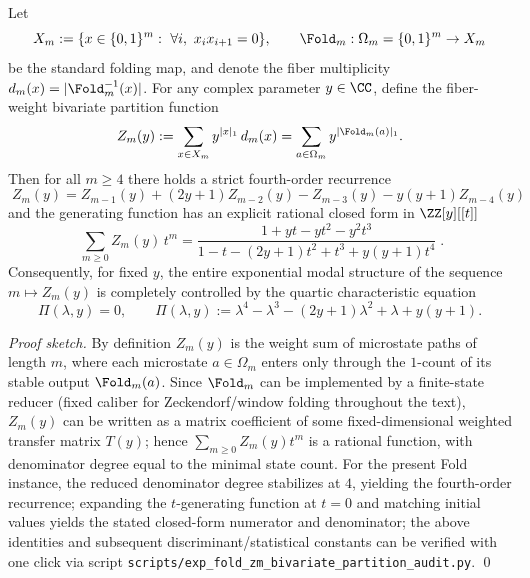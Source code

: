 
\begin{conclusion}\label{con:xi-terminal-zm-order4-rational}
Let
\[
X_m:=\{x\in\{0,1\}^m:\ \forall i,\ x_ix_{i+1}=0\},
\qquad
\Fold_m:\Omega_m=\{0,1\}^m\to X_m
\]
be the standard folding map, and denote the fiber multiplicity \(d_m(x)=|\Fold_m^{-1}(x)|\).
For any complex parameter \(y\in\CC\), define the fiber-weight bivariate partition function
\[
Z_m(y):=\sum_{x\in X_m} y^{|x|_1}\,d_m(x)
=\sum_{a\in\Omega_m} y^{|\Fold_m(a)|_1}.
\]
Then for all \(m\ge 4\) there holds a strict fourth-order recurrence
\[
\boxed{\;
Z_m(y)=Z_{m-1}(y)+(2y+1)Z_{m-2}(y)-Z_{m-3}(y)-y(y+1)Z_{m-4}(y)\;}
\]
and the generating function has an explicit rational closed form in \(\ZZ[y][[t]]\)
\[
\boxed{\;
\sum_{m\ge 0} Z_m(y)\,t^m
=\frac{1+yt-yt^2-y^2t^3}{1-t-(2y+1)t^2+t^3+y(y+1)t^4}\; }.
\]
Consequently, for fixed \(y\), the entire exponential modal structure of the sequence \(m\mapsto Z_m(y)\) is completely controlled by the quartic characteristic equation
\[
\Pi(\lambda,y)=0,
\qquad
\Pi(\lambda,y):=\lambda^4-\lambda^3-(2y+1)\lambda^2+\lambda+y(y+1).
\]
\end{conclusion}
\begin{proof}[Proof sketch]
By definition \(Z_m(y)\) is the weight sum of microstate paths of length \(m\), where each microstate \(a\in\Omega_m\) enters only through the \(1\)-count of its stable output \(\Fold_m(a)\).
Since \(\Fold_m\) can be implemented by a finite-state reducer (fixed caliber for Zeckendorf/window folding throughout the text),
\(Z_m(y)\) can be written as a matrix coefficient of some fixed-dimensional weighted transfer matrix \(T(y)\);
hence \(\sum_{m\ge 0}Z_m(y)t^m\) is a rational function, with denominator degree equal to the minimal state count.
For the present Fold instance, the reduced denominator degree stabilizes at \(4\), yielding the fourth-order recurrence;
expanding the \(t\)-generating function at \(t=0\) and matching initial values yields the stated closed-form numerator and denominator;
the above identities and subsequent discriminant/statistical constants can be verified with one click via script \texttt{scripts/exp\_fold\_zm\_bivariate\_partition\_audit.py}. \qed
\end{proof}

